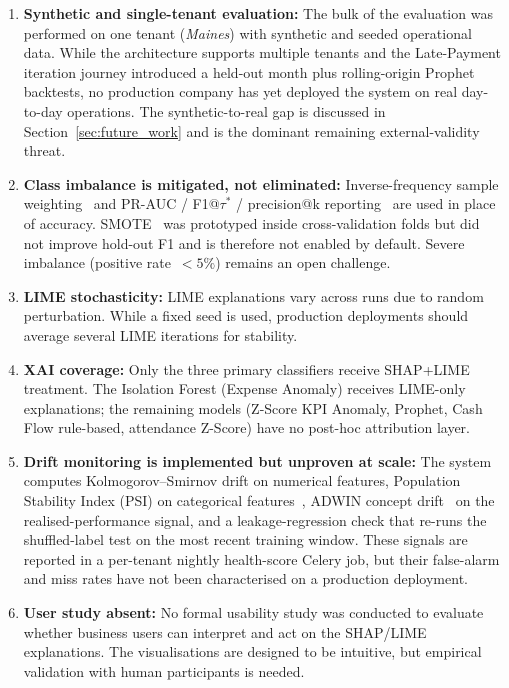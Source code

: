 \documentclass[12pt,a4paper]{report}
\begin{document}
\begin{enumerate}[label=\arabic*.]
  \item \textbf{Synthetic and single-tenant evaluation:} The bulk of the evaluation was performed on one tenant (\textit{Maines}) with synthetic and seeded operational data. While the architecture supports multiple tenants and the Late-Payment iteration journey introduced a held-out month plus rolling-origin Prophet backtests, no production company has yet deployed the system on real day-to-day operations. The synthetic-to-real gap is discussed in Section~\ref{sec:future_work} and is the dominant remaining external-validity threat.

  \item \textbf{Class imbalance is mitigated, not eliminated:} Inverse-frequency sample weighting~\citep{he2009imbalanced} and PR-AUC / F1@$\tau^{*}$ / precision@k reporting~\citep{saito2015prauc} are used in place of accuracy. SMOTE~\citep{chawla2002smote} was prototyped inside cross-validation folds but did not improve hold-out F1 and is therefore not enabled by default. Severe imbalance (positive rate~$<5\%$) remains an open challenge.

  \item \textbf{LIME stochasticity:} LIME explanations vary across runs due to random perturbation. While a fixed seed is used, production deployments should average several LIME iterations for stability.

  \item \textbf{XAI coverage:} Only the three primary classifiers receive SHAP+LIME treatment. The Isolation Forest (Expense Anomaly) receives LIME-only explanations; the remaining models (Z-Score KPI Anomaly, Prophet, Cash Flow rule-based, attendance Z-Score) have no post-hoc attribution layer.

  \item \textbf{Drift monitoring is implemented but unproven at scale:} The system computes Kolmogorov--Smirnov drift on numerical features, Population Stability Index (PSI) on categorical features~\citep{wu2019psi}, ADWIN concept drift~\citep{bifet2007adwin} on the realised-performance signal, and a leakage-regression check that re-runs the shuffled-label test on the most recent training window. These signals are reported in a per-tenant nightly health-score Celery job, but their false-alarm and miss rates have not been characterised on a production deployment.

  \item \textbf{User study absent:} No formal usability study was conducted to evaluate whether business users can interpret and act on the SHAP/LIME explanations. The visualisations are designed to be intuitive, but empirical validation with human participants is needed.
\end{enumerate}
\end{document}
